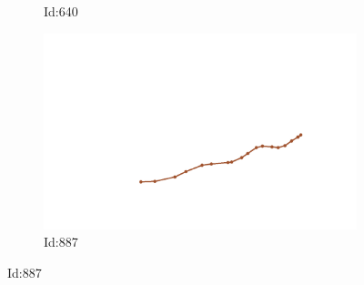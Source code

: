\documentclass[12pt,twoside]{report}
\begin{document}
\begin{figure}
\begin{subfigure}[b]{0.20\textwidth}
\caption{Id:640}
\end{subfigure}
\begin{subfigure}[b]{0.20\textwidth}
\centering
\includegraphics[width=\textwidth]{../../trajectories/887.png}
\caption{Id:887}
\end{subfigure}
\end{figure}
\end{document}
